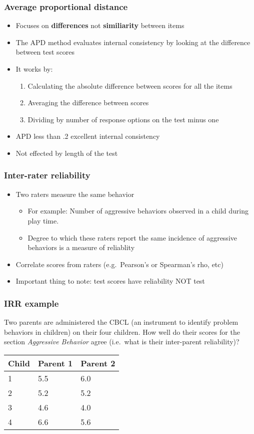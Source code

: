 \documentclass[dvipsnames]{beamer}\usepackage[]{graphicx}\usepackage[]{color}
\begin{document}
\begin{frame}
\frametitle{Average proportional distance}
\begin{itemize}
  \item Focuses on \textbf{differences} not \textbf{similiarity} between items
  \item The APD method evaluates internal consistency by looking at the difference between test scores
  \item It works by:
    \begin{enumerate}
      \item Calculating the absolute difference between scores for all the items
      \item Averaging the difference between scores
      \item Dividing by number of response options on the test minus one
    \end{enumerate}
    \item APD less than .2 excellent internal consistency
    \item Not effected by length of the test
\end{itemize}
\end{frame}

\begin{frame}
\frametitle{Inter-rater reliability}
\begin{itemize}
\item Two raters measure the same behavior
  \begin{itemize}
  \item For example: Number of aggressive behaviors observed in a child during play time.
  \item Degree to which these raters report the same incidence of aggressive behaviors is a measure of reliablity
  \end{itemize}
\item Correlate scores from raters (e.g.\ Pearson's or Spearman's rho, etc)
\item Important thing to note: test scores have reliability NOT test
\end{itemize}
\end{frame}

\begin{frame}
\frametitle{IRR example}

Two parents are administered the CBCL (an instrument to identify problem behaviors in children) on their four children. How well do their scores for the section \textit{Aggressive Behavior} agree (i.e.\ what is their inter-parent reliability)?

\begin{center}
\begin{tabular}{lll}
\hline
Child &	Parent 1 &	Parent 2 \\
\hline
1&	5.5	&6.0\\
2&	5.2	&5.2\\
3&	4.6&	4.0\\
4&	6.6&	5.6\\
\hline
\end{tabular}
\end{center}
\end{frame}
\end{document}
